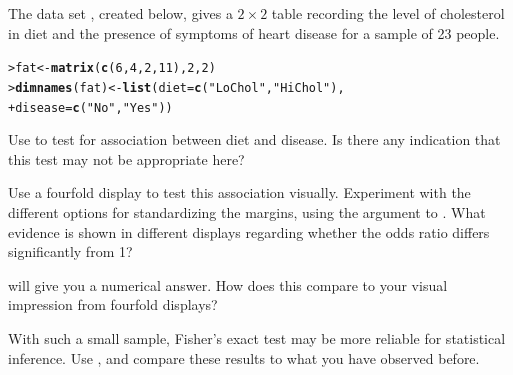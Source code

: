 \documentclass[10pt]{report}\usepackage[]{graphicx}\usepackage[]{color}
\makeatletter
\newcommand{\hlnum}[1]{\textcolor[rgb]{0.686,0.059,0.569}{#1}}%
\newcommand{\hlstr}[1]{\textcolor[rgb]{0.192,0.494,0.8}{#1}}%
\newcommand{\hlstd}[1]{\textcolor[rgb]{0.345,0.345,0.345}{#1}}%
\newcommand{\hlkwb}[1]{\textcolor[rgb]{0.69,0.353,0.396}{#1}}%
\newcommand{\hlkwc}[1]{\textcolor[rgb]{0.333,0.667,0.333}{#1}}%
\newcommand{\hlkwd}[1]{\textcolor[rgb]{0.737,0.353,0.396}{\textbf{#1}}}%
\newenvironment{kframe}{%
 \def\at@end@of@kframe{}%
 \ifinner\ifhmode%
  \def\at@end@of@kframe{\end{minipage}}%
  \begin{minipage}{\columnwidth}%
 \fi\fi%
 \def\FrameCommand##1{\hskip\@totalleftmargin \hskip-\fboxsep
 \colorbox{shadecolor}{##1}\hskip-\fboxsep
     \hskip-\linewidth \hskip-\@totalleftmargin \hskip\columnwidth}%
 \MakeFramed {\advance\hsize-\width
   \@totalleftmargin\z@ \linewidth\hsize
   \@setminipage}}%
 {\par\unskip\endMakeFramed%
 \at@end@of@kframe}
\newenvironment{knitrout}{}{} %
\renewenvironment{knitrout}{\small\renewcommand{\baselinestretch}{.85}}{} %
\makeatother
\begin{document}
\begin{Exercises}

  \exercise The data set , created below, gives a $2 \times 2$ table recording the level of
  cholesterol in diet and the presence of symptoms of heart disease for a sample of
  23 people.

\begin{knitrout}\footnotesize
{}\color{fgcolor}\begin{kframe}
\begin{alltt}
\hlstd{> }\hlstd{fat} \hlkwb{<-} \hlkwd{matrix}\hlstd{(}\hlkwd{c}\hlstd{(}\hlnum{6}\hlstd{,} \hlnum{4}\hlstd{,} \hlnum{2}\hlstd{,} \hlnum{11}\hlstd{),} \hlnum{2}\hlstd{,} \hlnum{2}\hlstd{)}
\hlstd{> }\hlkwd{dimnames}\hlstd{(fat)} \hlkwb{<-} \hlkwd{list}\hlstd{(}\hlkwc{diet} \hlstd{=} \hlkwd{c}\hlstd{(}\hlstr{"LoChol"}\hlstd{,} \hlstr{"HiChol"}\hlstd{),}
\hlstd{+ }                      \hlkwc{disease} \hlstd{=} \hlkwd{c}\hlstd{(}\hlstr{"No"}\hlstd{,} \hlstr{"Yes"}\hlstd{))}
\end{alltt}
\end{kframe}
\end{knitrout}

  \begin{enumerate*}
    \item Use  to test for association between diet and disease.
    Is there any indication that this test may not be appropriate here?
    \begin{ans}
    \end{ans}
    
    
    \item Use a fourfold display to test this association visually.  Experiment with    
    the different options for standardizing the margins, using the 
    argument to . What evidence is shown in different displays regarding
    whether the odds ratio differs significantly from 1?
    \begin{ans}
    \end{ans}
    
    \item {} will give you a numerical answer.  How does
    this compare to your visual impression from fourfold displays?
    \begin{ans}
    \end{ans}
    
    \item With such a small sample, Fisher's exact test may be more reliable for statistical
    inference.  Use , and compare these results to what you have
    observed before.
    \begin{ans}
    \end{ans}
    

\end{enumerate*}
\end{Exercises}
\end{document}
